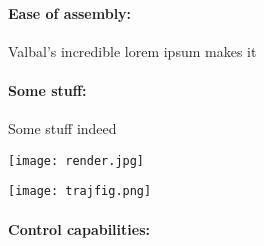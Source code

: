 \documentclass[12pt, twocolumn]{article}
\begin{document}
{\footnotesize 

\paragraph{\sffamily Ease of assembly:} Valbal's incredible lorem ipsum makes it \Blindtext[1][5]

\paragraph{\sffamily Some stuff:} Some stuff indeed \Blindtext[1][3]

\begin{center}\texttt{[image: render.jpg]}\end{center}
\begin{center}\texttt{[image: trajfig.png]}\end{center}

\paragraph{\sffamily Control capabilities:} \Blindtext[1][5]
}
\end{document}
